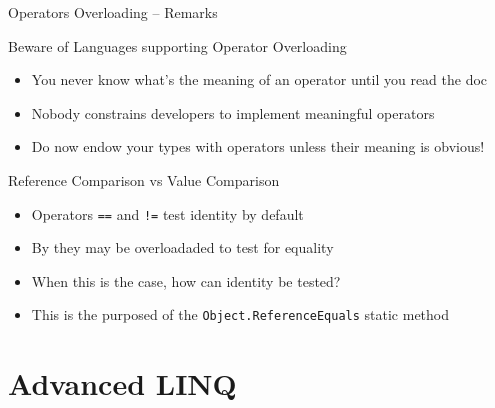 \documentclass[presentation]{beamer}
\begin{document}
\begin{frame}{Operators Overloading -- Remarks}
  \begin{alertblock}{Beware of Languages supporting Operator Overloading}
    \begin{itemize}
      \item You never know what's the meaning of an operator until you \alert{read the doc}
      \item Nobody constrains developers to implement \alert{meaningful} operators
      \item Do now endow your types with operators unless their meaning is \alert{obvious}!
    \end{itemize}
  \end{alertblock}

  \begin{exampleblock}{Reference Comparison vs Value Comparison}
    \begin{itemize}
      \item Operators \texttt{==} and \texttt{!=} test identity by default
      \item By they may be overloadaded to test for equality
      \item When this is the case, how can identity be tested?
      \item This is the purposed of the \texttt{Object.ReferenceEquals} static method
    \end{itemize}
  \end{exampleblock}
\end{frame}

\section{Advanced LINQ}
\end{document}
